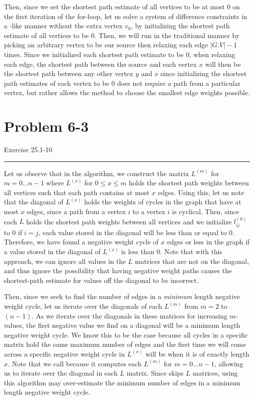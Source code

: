 \documentclass[11pt]{article}
\def\separateline{\medskip\hrule\medskip}
\begin{document}
Then, since we set the shortest path estimate of all vertices to be at most 0 on the first iteration of the for-loop, let us solve a system of difference constraints in a -like manner without the extra vertex $v_0$, by initializing the shortest path estimate of all vertices to be 0. Then, we will run  in the traditional manner by picking an arbitrary vertex to be our source then relaxing each edge $|G.V| - 1$ times. Since we initialized each shortest path estimate to be 0, when relaxing each edge, the shortest path between the source and each vertex $x$ will then be the shortest path between any other vertex $y$ and $x$ since initializing the shortest path estimates of each vertex to be 0 does not require a path from a particular vertex, but rather allows the  method to choose the smallest edge weights possible.

\newpage


\section{Problem 6-3}
Exercise 25.1-10
\separateline

Let us observe that in the  algorithm, we construct the matrix $L^{(m)}$ for $m=0...n-1$ where $L^{(x)}$ for $0 \leq x \leq m$ holds the shortest path weights between all vertices such that each path contains at most $x$ edges. Using this, let us note that the diagonal of $L^{(x)}$ holds the weights of cycles in the graph that have at most $x$ edges, since a path from a vertex $i$ to a vertex $i$ is cyclical. Then, since each $L$ holds the shortest path weights between all vertices and we initialize $l_{ij}^{(0)}$ to $0$ if $i=j$, each value stored in the diagonal will be less than or equal to 0. Therefore, we have found a negative weight cycle of $x$ edges or less in the graph if a value stored in the diagonal of $L^{(x)}$ is less than 0. Note that with this approach, we can ignore all values in the $L$ matrices that are not on the diagonal, and thus ignore the possibility that having negative weight paths causes the shortest-path estimate for values off the diagonal to be incorrect.

Then, since we seek to find the number of edges in a \textit{minimum} length negative weight cycle, let us iterate over the diagonals of each $L^{(m)}$ from $m=2$ to $(n-1)$. As we iterate over the diagonals in these matrices for increasing $m$-values, the first negative value we find on a diagonal will be a minimum length negative weight cycle. We know this to be the case because all cycles in a specific matrix hold the same maximum number of edges and the first time we will come across a specific negative weight cycle in $L^{(x)}$ will be when it is of exactly length $x$. Note that we call  because it computes each $L^{(m)}$ for $m=0...n-1$, allowing us to iterate over the diagonal in each $L$ matrix. Since  skips $L$ matrices, using this algorithm may over-estimate the minimum number of edges in a minimum length negative weight cycle.
\end{document}
